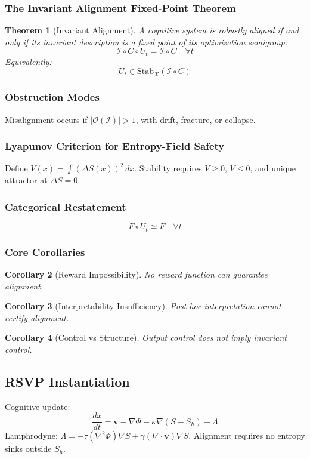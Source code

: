 \documentclass[11pt,a4paper]{article}
\theoremstyle{plain}
\newtheorem{theorem}{Theorem}[section]
\newtheorem{corollary}[theorem]{Corollary}
\begin{document}
\subsubsection{The Invariant Alignment Fixed-Point Theorem}
\begin{theorem}[Invariant Alignment]
A cognitive system is robustly aligned if and only if its invariant description is a fixed point of its optimization semigroup:
\[
\mathcal{I} \circ C \circ U_t = \mathcal{I} \circ C \quad \forall t
\]
Equivalently:
\[
U_t \in \text{Stab}_{\mathcal{X}}(\mathcal{I} \circ C)
\]
\end{theorem}

\subsubsection{Obstruction Modes}
Misalignment occurs if $|\mathcal{O}(\mathcal{I})| > 1$, with drift, fracture, or collapse.

\subsubsection{Lyapunov Criterion for Entropy-Field Safety}
Define $V(x) = \int (\Delta S(x))^2 \, dx$. Stability requires $V \ge 0$, $\dot{V} \le 0$, and unique attractor at $\Delta S = 0$.

\subsubsection{Categorical Restatement}
\[
F \circ U_t \simeq F \quad \forall t
\]

\subsubsection{Core Corollaries}
\begin{corollary}[Reward Impossibility]
No reward function can guarantee alignment.
\end{corollary}
\begin{corollary}[Interpretability Insufficiency]
Post-hoc interpretation cannot certify alignment.
\end{corollary}
\begin{corollary}[Control vs Structure]
Output control does not imply invariant control.
\end{corollary}

\subsection{RSVP Instantiation}
Cognitive update:
\[
\frac{dx}{dt} = \mathbf{v} - \nabla \Phi - \kappa \nabla (S - S_h) + \Lambda
\]
Lamphrodyne: $\Lambda = -\tau (\nabla^2 \Phi) \nabla S + \gamma (\nabla \cdot \mathbf{v}) \nabla S$. Alignment requires no entropy sinks outside $S_h$.
\end{document}
